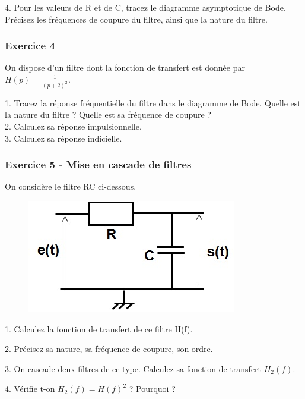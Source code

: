 	4. Pour les valeurs de R et de C, tracez le diagramme asymptotique de Bode. Précisez les fréquences de coupure du filtre, ainsi que la nature du filtre.\\
	
	\subsubsection{Exercice 4}
	On dispose d'un filtre dont la fonction de transfert est donnée par $H(p)=\frac{1}{(p+2)^2}$.
	
	1. Tracez la réponse fréquentielle du filtre dans le diagramme de Bode. Quelle est la nature du filtre ? Quelle est sa fréquence de coupure ? \\
	
	2. Calculez sa réponse impulsionnelle.\\
	
	3. Calculez sa réponse indicielle. \\
	

	
	\subsubsection{Exercice 5 - Mise en cascade de filtres}
	On considère le filtre RC ci-dessous.
	
	\begin{figure}[h!]
		\centering
		\includegraphics[scale=0.5]{images/Filtre_RC_passe_bas.jpg} 
	\end{figure}
	
	1. Calculez la fonction de transfert de ce filtre H(f).
	
	2. Précisez sa nature, sa fréquence de coupure, son ordre.
	
	3. On cascade deux filtres de ce type. Calculez sa fonction de transfert $H_{2}(f)$.
	
	4. Vérifie t-on $H_{2}(f)=H(f)^{2}$ ? Pourquoi ?
